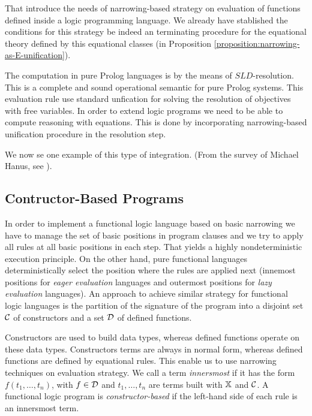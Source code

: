 That introduce the needs of narrowing-based strategy on evaluation of functions defined inside a logic programming language. We already have stablished the conditions for this strategy be indeed an terminating procedure for the equational theory defined by this equational classes (in Proposition \ref{proposition:narrowing-as-E-unification}).

The computation in pure Prolog languages is by the means of $SLD$-resolution. This is a complete and sound operational semantic for pure Prolog systems. This evaluation rule use standard unfication for solving the resolution of objectives with free variables. In order to extend logic programs we need to be able to compute reasoning with equations. This is done by incorporating narrowing-based unification procedure in the resolution step.

We now se one example of this type of integration. (From the survey of Michael Hanus, see \cite{HANUS1994583}).

\subsection{Contructor-Based Programs}
In order to implement a functional logic language based on basic narrowing we have to manage the set of basic positions in program clauses and we try to apply all rules at all basic positions in each step. That yields a highly nondeterministic execution principle. On the other hand, pure functional languages deterministically select the position where the rules are applied next (innemost positions for \textit{eager evaluation} languages and outermost positions for \textit{lazy evaluation} languages). An approach to achieve similar strategy for functional logic languages is the partition of the signature of the program into a disjoint set $\mathcal{C}$ of constructors and a set $\mathcal{D}$ of defined functions.

Constructors are used to build data types, whereas defined functions operate on these data types. Constructors terms are always in normal form, whereas defined functions are defined by equational rules. This enable us to use narrowing techniques on evaluation strategy. We call a term \textit{innersmost} if it has the form $f(t_1, \dots, t_n)$, with $f \in \mathcal{D}$ and $t_1, \dots, t_n$ are terms built with $\mathbb{X}$ and $\mathcal{C}$. A functional logic program is \textit{constructor-based} if the left-hand side of each rule is an innersmost term.

